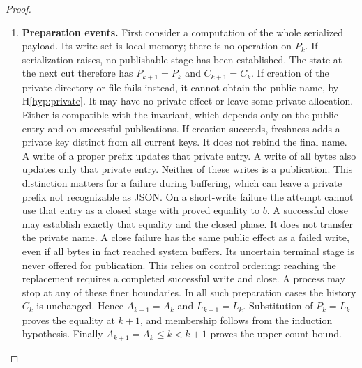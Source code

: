 \documentclass[12pt]{article}
\begin{document}
\begin{proof}
\begin{enumerate}
\item \textbf{Preparation events.}
First consider a computation of the whole serialized payload.
Its write set is local memory; there is no operation on $P_k$.
If serialization raises, no publishable stage has been
established. The state at the next cut therefore has
$P_{k+1}=P_k$ and $C_{k+1}=C_k$.
If creation of the private directory or file fails instead, it
cannot obtain the public name, by H\ref{hyp:private}.
It may have no private effect or leave some private allocation.
Either is compatible with the invariant, which depends only on
the public entry and on successful publications.
If creation succeeds, freshness adds a private key distinct
from all current keys. It does not rebind the final name.
A write of a proper prefix updates that private entry.
A write of all bytes also updates only that private entry.
Neither of these writes is a publication.
This distinction matters for a failure during buffering, which
can leave a private prefix not recognizable as JSON.
On a short-write failure the attempt cannot use that entry
as a closed stage with proved equality to $b$.
A successful close may establish exactly that equality and the
closed phase. It does not transfer the private name.
A close failure has the same public effect as a failed write,
even if all bytes in fact reached system buffers.
Its uncertain terminal stage is never offered for publication.
This relies on control ordering: reaching the replacement
requires a completed successful write and close.
A process may stop at any of these finer boundaries.
In all such preparation cases the history $C_k$ is unchanged.
Hence $A_{k+1}=A_k$ and $L_{k+1}=L_k$.
Substitution of $P_k=L_k$ proves the equality at $k+1$,
and membership follows from the induction hypothesis.
Finally $A_{k+1}=A_k\leq k<k+1$ proves the upper count bound.


\end{enumerate}
\end{proof}
\end{document}
